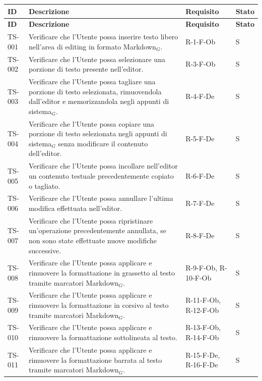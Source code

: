 \documentclass[a4paper, 10pt, colorlinks=true, linkcolor=black, urlcolor=blue, citecolor=blue, hidelinks]{article}
\begin{document}
\begingroup
\small
\renewcommand{\arraystretch}{1.25}
\begin{longtable}{|p{1.4cm}|p{7.8cm}|p{2.3cm}|p{1.2cm}|}
    \hline
    \textbf{ID} & \textbf{Descrizione} & \textbf{Requisito} & \textbf{Stato} \\
    \hline
    \endfirsthead

    \hline
    \textbf{ID} & \textbf{Descrizione} & \textbf{Requisito} & \textbf{Stato} \\
    \hline
    \endhead

    TS-001 & Verificare che l'Utente possa inserire testo libero nell'area di editing in formato Markdown$_G$. & R-1-F-Ob & S \\
    \hline
    TS-002 & Verificare che l'Utente possa selezionare una porzione di testo presente nell'editor. & R-3-F-Ob & S \\
    \hline
    TS-003 & Verificare che l'Utente possa tagliare una porzione di testo selezionata, rimuovendola dall'editor e memorizzandola negli appunti di sistema$_G$. & R-4-F-De & S \\
    \hline
    TS-004 & Verificare che l'Utente possa copiare una porzione di testo selezionata negli appunti di sistema$_G$ senza modificare il contenuto dell'editor. & R-5-F-De & S \\
    \hline
    TS-005 & Verificare che l'Utente possa incollare nell'editor un contenuto testuale precedentemente copiato o tagliato. & R-6-F-De & S \\
    \hline
    TS-006 & Verificare che l'Utente possa annullare l'ultima modifica effettuata nell'editor. & R-7-F-De & S \\
    \hline
    TS-007 & Verificare che l'Utente possa ripristinare un'operazione precedentemente annullata, se non sono state effettuate nuove modifiche successive. & R-8-F-De & S \\
    \hline
    TS-008 & Verificare che l'Utente possa applicare e rimuovere la formattazione in grassetto al testo tramite marcatori Markdown$_G$. & R-9-F-Ob, R-10-F-Ob & S \\
    \hline
    TS-009 & Verificare che l'Utente possa applicare e rimuovere la formattazione in corsivo al testo tramite marcatori Markdown$_G$. & R-11-F-Ob, R-12-F-Ob & S \\
    \hline
    TS-010 & Verificare che l'Utente possa applicare e rimuovere la formattazione sottolineata al testo. & R-13-F-Ob, R-14-F-Ob & S \\
    \hline
    TS-011 & Verificare che l'Utente possa applicare e rimuovere la formattazione barrata al testo tramite marcatori Markdown$_G$. & R-15-F-De, R-16-F-De & S \\

\end{longtable}
\end{document}
